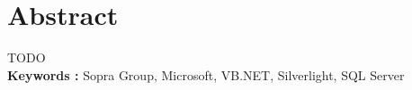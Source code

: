 \cleardoublepage

\chapter*{Abstract}



TODO
\\

\textbf{Keywords : } Sopra Group, Microsoft, VB.NET, Silverlight, SQL Server